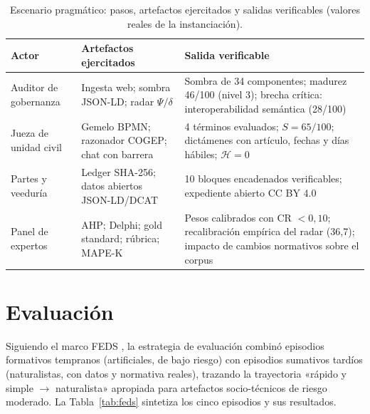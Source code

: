 \documentclass[computers,article,submit,pdftex,moreauthors]{Definitions/mdpi}
\begin{document}
\begin{table}[H]
\caption{Escenario pragmático: pasos, artefactos ejercitados y salidas verificables (valores reales de la instanciación).}
\label{tab:escenario}
\begin{tabularx}{\textwidth}{lXX}
\toprule
\textbf{Actor} & \textbf{Artefactos ejercitados} & \textbf{Salida verificable}\\
\midrule
Auditor de gobernanza & Ingesta web; sombra JSON-LD; radar $\Psi/\delta$ & Sombra de 34 componentes; madurez 46/100 (nivel 3); brecha crítica: interoperabilidad semántica (28/100)\\
Jueza de unidad civil & Gemelo BPMN; razonador COGEP; chat con barrera & 4 términos evaluados; $S = 65/100$; dictámenes con artículo, fechas y días hábiles; $\mathcal{H} = 0$\\
Partes y veeduría & Ledger SHA-256; datos abiertos JSON-LD/DCAT & 10 bloques encadenados verificables; expediente abierto CC BY 4.0\\
Panel de expertos & AHP; Delphi; gold standard; rúbrica; MAPE-K & Pesos calibrados con CR $< 0{,}10$; recalibración empírica del radar (36{,}7); impacto de cambios normativos sobre el corpus\\
\bottomrule
\end{tabularx}
\end{table}

\section{Evaluación}
\label{sec:eval}

Siguiendo el marco FEDS \cite{Venable2016}, la estrategia de evaluación combinó episodios formativos tempranos (artificiales, de bajo riesgo) con episodios sumativos tardíos (naturalistas, con datos y normativa reales), trazando la trayectoria «rápido y simple $\rightarrow$ naturalista» apropiada para artefactos socio-técnicos de riesgo moderado. La Tabla~\ref{tab:feds} sintetiza los cinco episodios y sus resultados.
\end{document}
